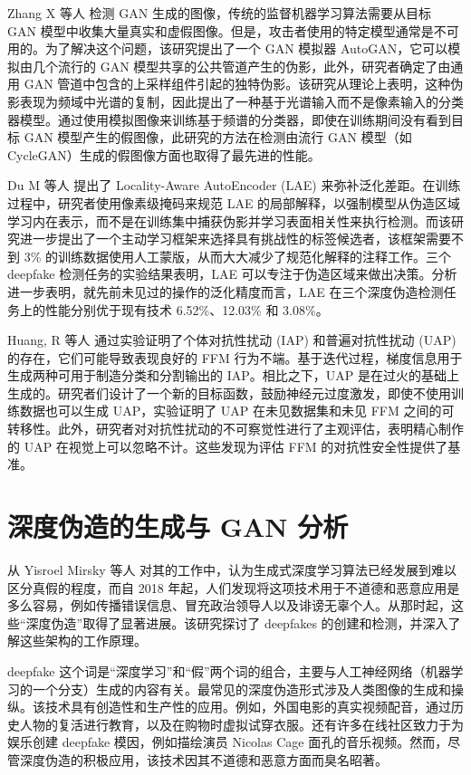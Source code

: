 Zhang X 等人 \cite{zhang2019detecting} 检测 GAN 生成的图像，传统的监督机器学习算法需要从目标 GAN 模型中收集大量真实和虚假图像。但是，攻击者使用的特定模型通常是不可用的。为了解决这个问题，该研究提出了一个 GAN 模拟器 AutoGAN，它可以模拟由几个流行的 GAN 模型共享的公共管道产生的伪影，此外，研究者确定了由通用 GAN 管道中包含的上采样组件引起的独特伪影。该研究从理论上表明，这种伪影表现为频域中光谱的复制，因此提出了一种基于光谱输入而不是像素输入的分类器模型。通过使用模拟图像来训练基于频谱的分类器，即使在训练期间没有看到目标 GAN 模型产生的假图像，此研究的方法在检测由流行 GAN 模型（如 CycleGAN）生成的假图像方面也取得了最先进的性能。

Du M 等人 \cite{du2019towards} 提出了 Locality-Aware AutoEncoder (LAE) 来弥补泛化差距。在训练过程中，研究者使用像素级掩码来规范 LAE 的局部解释，以强制模型从伪造区域学习内在表示，而不是在训练集中捕获伪影并学习表面相关性来执行检测。而该研究进一步提出了一个主动学习框架来选择具有挑战性的标签候选者，该框架需要不到 3\% 的训练数据使用人工蒙版，从而大大减少了规范化解释的注释工作。三个 deepfake 检测任务的实验结果表明，LAE 可以专注于伪造区域来做出决策。分析进一步表明，就先前未见过的操作的泛化精度而言，LAE 在三个深度伪造检测任务上的性能分别优于现有技术 6.52\%、12.03\% 和 3.08\%。

Huang, R 等人 \cite{huang2020security} 通过实验证明了个体对抗性扰动 (IAP) 和普遍对抗性扰动 (UAP) 的存在，它们可能导致表现良好的 FFM 行为不端。基于迭代过程，梯度信息用于生成两种可用于制造分类和分割输出的 IAP。相比之下，UAP 是在过火的基础上生成的。研究者们设计了一个新的目标函数，鼓励神经元过度激发，即使不使用训练数据也可以生成 UAP，实验证明了 UAP 在未见数据集和未见 FFM 之间的可转移性。此外，研究者对对抗性扰动的不可察觉性进行了主观评估，表明精心制作的 UAP 在视觉上可以忽略不计。这些发现为评估 FFM 的对抗性安全性提供了基准。

\section{深度伪造的生成与 GAN 分析}

从 Yisroel Mirsky 等人 \cite{DBLP:journals/corr/abs-2004-11138} 对其的工作中，认为生成式深度学习算法已经发展到难以区分真假的程度，而自 2018 年起，人们发现将这项技术用于不道德和恶意应用是多么容易，例如传播错误信息、冒充政治领导人以及诽谤无辜个人。从那时起，这些“深度伪造”取得了显著进展。该研究探讨了 deepfakes 的创建和检测，并深入了解这些架构的工作原理。

deepfake 这个词是“深度学习”和“假”两个词的组合，主要与人工神经网络（机器学习的一个分支）生成的内容有关。最常见的深度伪造形式涉及人类图像的生成和操纵。该技术具有创造性和生产性的应用。例如，外国电影的真实视频配音，通过历史人物的复活进行教育，以及在购物时虚拟试穿衣服。还有许多在线社区致力于为娱乐创建 deepfake 模因，例如描绘演员 Nicolas Cage 面孔的音乐视频。然而，尽管深度伪造的积极应用，该技术因其不道德和恶意方面而臭名昭著。

